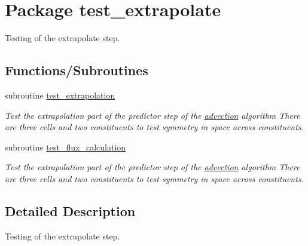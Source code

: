 \hypertarget{a00040}{
\section{Package test\_\-extrapolate}
\label{a00040}
}
Testing of the extrapolate step.  


\subsection*{Functions/Subroutines}
\begin{CompactItemize}
\item 
\hypertarget{a00040_00d7b0df4f9649d6a2e2dbdfc67caaad}{
subroutine \hyperlink{a00040_00d7b0df4f9649d6a2e2dbdfc67caaad}{test\_\-extrapolation}}
\label{a00040_00d7b0df4f9649d6a2e2dbdfc67caaad}

\begin{CompactList}\small\item\em Test the extrapolation part of the predictor step of the \hyperlink{a00026}{advection} algorithm There are three cells and two constituents to test symmetry in space across constituents. \item\end{CompactList}\item 
\hypertarget{a00040_e96d656ee79443b70cfeafb62d802f36}{
subroutine \hyperlink{a00040_e96d656ee79443b70cfeafb62d802f36}{test\_\-flux\_\-calculation}}
\label{a00040_e96d656ee79443b70cfeafb62d802f36}

\begin{CompactList}\small\item\em Test the extrapolation part of the predictor step of the \hyperlink{a00026}{advection} algorithm There are three cells and two constituents to test symmetry in space across constituents. \item\end{CompactList}\end{CompactItemize}


\subsection{Detailed Description}
Testing of the extrapolate step. 

